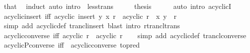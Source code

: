 \begin{isabellebody}
\ that\ \isamarkupfalse%
\ induct\ {\isacharparenleft}{\kern0pt}auto\ intro{\isacharcolon}{\kern0pt}\ {\isacharasterisk}{\kern0pt}\ less{\isacharunderscore}{\kern0pt}trans{\isacharparenright}{\kern0pt}\isanewline
\ \ \isamarkupfalse%
\ \isamarkupfalse%
\ {\isacharquery}{\kern0pt}thesis\isanewline
\ \ \ \ \isamarkupfalse%
\ {\isacharparenleft}{\kern0pt}auto\ intro{\isacharbang}{\kern0pt}{\isacharcolon}{\kern0pt}\ acyclicI{\isacharparenright}{\kern0pt}\isanewline
{}\isamarkupfalse%
%
\endisatagproof
{\isafoldproof}%
%
\isadelimproof
\isanewline
%
\endisadelimproof
\isanewline
{}\isamarkupfalse%
\ acyclic{\isacharunderscore}{\kern0pt}insert\ {\isacharbrackleft}{\kern0pt}iff{\isacharbrackright}{\kern0pt}{\isacharcolon}{\kern0pt}\ {\isachardoublequoteopen}acyclic\ {\isacharparenleft}{\kern0pt}insert\ {\isacharparenleft}{\kern0pt}y{\isacharcomma}{\kern0pt}\ x{\isacharparenright}{\kern0pt}\ r{\isacharparenright}{\kern0pt}\ {\isasymlongleftrightarrow}\ acyclic\ r\ {\isasymand}\ {\isacharparenleft}{\kern0pt}x{\isacharcomma}{\kern0pt}\ y{\isacharparenright}{\kern0pt}\ {\isasymnotin}\ r\isactrlsup {\isacharasterisk}{\kern0pt}{\isachardoublequoteclose}\isanewline
%
\isadelimproof
\ \ %
\endisadelimproof
%
\isatagproof
{}\isamarkupfalse%
\ {\isacharparenleft}{\kern0pt}simp\ add{\isacharcolon}{\kern0pt}\ acyclic{\isacharunderscore}{\kern0pt}def\ trancl{\isacharunderscore}{\kern0pt}insert{\isacharparenright}{\kern0pt}\ {\isacharparenleft}{\kern0pt}blast\ intro{\isacharcolon}{\kern0pt}\ rtrancl{\isacharunderscore}{\kern0pt}trans{\isacharparenright}{\kern0pt}%
\endisatagproof
{\isafoldproof}%
%
\isadelimproof
\isanewline
%
\endisadelimproof
\isanewline
{}\isamarkupfalse%
\ acyclic{\isacharunderscore}{\kern0pt}converse\ {\isacharbrackleft}{\kern0pt}iff{\isacharbrackright}{\kern0pt}{\isacharcolon}{\kern0pt}\ {\isachardoublequoteopen}acyclic\ {\isacharparenleft}{\kern0pt}r{\isasyminverse}{\isacharparenright}{\kern0pt}\ {\isasymlongleftrightarrow}\ acyclic\ r{\isachardoublequoteclose}\isanewline
%
\isadelimproof
\ \ %
\endisadelimproof
%
\isatagproof
{}\isamarkupfalse%
\ {\isacharparenleft}{\kern0pt}simp\ add{\isacharcolon}{\kern0pt}\ acyclic{\isacharunderscore}{\kern0pt}def\ trancl{\isacharunderscore}{\kern0pt}converse{\isacharparenright}{\kern0pt}%
\endisatagproof
{\isafoldproof}%
%
\isadelimproof
\isanewline
%
\endisadelimproof
\isanewline
{}\isamarkupfalse%
\ acyclicP{\isacharunderscore}{\kern0pt}converse\ {\isacharbrackleft}{\kern0pt}iff{\isacharbrackright}{\kern0pt}\ {\isacharequal}{\kern0pt}\ acyclic{\isacharunderscore}{\kern0pt}converse\ {\isacharbrackleft}{\kern0pt}to{\isacharunderscore}{\kern0pt}pred{\isacharbrackright}{\kern0pt}\isanewline

\end{isabellebody}
